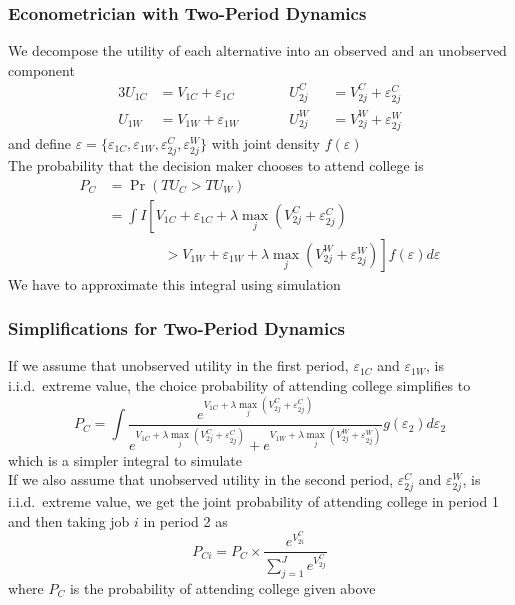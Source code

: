 \documentclass{beamer}
\begin{document}
\begin{frame}\frametitle{Econometrician with Two-Period Dynamics}
    We decompose the utility of each alternative into an observed and an unobserved component
    \begin{alignat*}{3}
        U_{1C} &= V_{1C} + \varepsilon_{1C} \qquad && U_{2j}^C &&= V_{2j}^C + \varepsilon_{2j}^C \\
        U_{1W} &= V_{1W} + \varepsilon_{1W} \qquad && U_{2j}^W &&= V_{2j}^W + \varepsilon_{2j}^W
    \end{alignat*}
    and define $\varepsilon = \{\varepsilon_{1C},\varepsilon_{1W}, \varepsilon_{2j}^C, \varepsilon_{2j}^W\}$ with joint density $f(\varepsilon)$ \\
    \vspace{2ex}
    The probability that the decision maker chooses to attend college is
    \begin{align*}
        P_C &= \Pr(TU_C > TU_W) \\
        &= \int I \left[ V_{1C} + \varepsilon_{1C} + \lambda \max_j(V_{2j}^C + \varepsilon_{2j}^C) \right. \\
        &\left. \qquad \qquad > V_{1W} + \varepsilon_{1W} + \lambda \max_j(V_{2j}^W + \varepsilon_{2j}^W)\right] f(\varepsilon) d \varepsilon
    \end{align*}
    We have to approximate this integral using simulation
\end{frame}

\begin{frame}\frametitle{Simplifications for Two-Period Dynamics}
    If we assume that unobserved utility in the first period, $\varepsilon_{1C}$ and $\varepsilon_{1W}$, is i.i.d.\ extreme value, the choice probability of attending college simplifies to
    $$P_C = \int \frac{e^{V_{1C} + \lambda \max_j(V_{2j}^C + \varepsilon_{2j}^C)}}{e^{V_{1C} + \lambda \max_j(V_{2j}^C + \varepsilon_{2j}^C)} + e^{V_{1W} + \lambda \max_j(V_{2j}^W + \varepsilon_{2j}^W)}} g(\varepsilon_2) d \varepsilon_2$$
    which is a simpler integral to simulate \\
    \vspace{3ex}
    If we also assume that unobserved utility in the second period, $\varepsilon_{2j}^C$ and $\varepsilon_{2j}^W$, is i.i.d.\ extreme value, we get the joint probability of attending college in period 1 and then taking job $i$ in period 2 as
    $$P_{Ci} = P_C \times \frac{e^{V_{2i}^C}}{\sum_{j = 1}^J e^{{V_{2j}^C}}}$$
    where $P_C$ is the probability of attending college given above
\end{frame}
\end{document}
